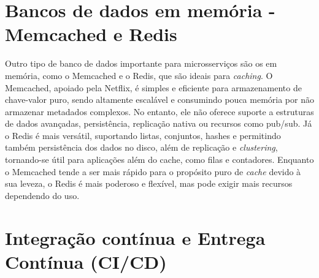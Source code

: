 \section{Bancos de dados em memória - Memcached e Redis}
Outro tipo de banco de dados importante para microsserviços são os em memória, como o Memcached e o Redis, que são ideais para \emph{caching}. O Memcached, apoiado pela Netflix, é simples e eficiente para armazenamento de chave-valor puro, sendo altamente escalável e consumindo pouca memória por não armazenar metadados complexos. No entanto, ele não oferece suporte a estruturas de dados avançadas, persistência, replicação nativa ou recursos como pub/sub. Já o Redis é mais versátil, suportando listas, conjuntos, hashes e permitindo também persistência dos dados no disco, além de replicação e \emph{clustering}, tornando-se útil para aplicações além do cache, como filas e contadores. Enquanto o Memcached tende a ser mais rápido para o propósito puro de \emph{cache} devido à sua leveza, o Redis é mais poderoso e flexível, mas pode exigir mais recursos dependendo do uso. \cite{memcached,redis}





\section{Integração contínua e Entrega Contínua (CI/CD)}

